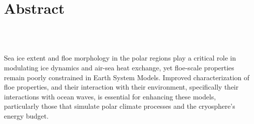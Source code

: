 \chapter{Abstract}				
\label{ch:abs}

%
\begin{center}
	\textbf{\Large \titl}\\
			\vskip 0.2cm
			\auth\\
			\vskip 0.2cm
	\textit{\footnotesize \FullDate}
			\vskip 1cm
\end{center}

Sea ice extent and floe morphology in the polar regions play a critical role in modulating ice dynamics and air-sea heat exchange, yet floe-scale properties remain poorly constrained in Earth System Models. Improved characterization of floe properties, and their interaction with their environment, specifically their interactions with ocean waves, is essential for enhancing these models, particularly those that simulate polar climate processes and the cryosphere's energy budget.

